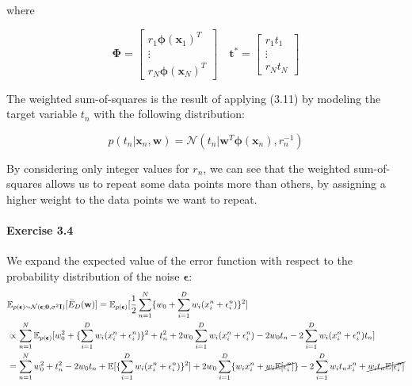 where

\begin{equation*}
\pmb{\Phi} = \begin{bmatrix}
    r_1\pmb{\phi}(\mathbf{x}_1)^T \\
    \vdots \\
    r_N\pmb{\phi}(\mathbf{x}_N)^T
\end{bmatrix} \quad
\mathbf{t}^{*} = \begin{bmatrix}
    r_1 t_1 \\
    \vdots \\
    r_N t_N
\end{bmatrix}
\end{equation*}

The weighted sum-of-squares is the result of applying (3.11) by modeling the target variable $t_n$ with the following distribution:

\begin{equation*}
    p(t_n | \mathbf{x}_n, \mathbf{w}) = \mathcal{N}(t_n | \mathbf{w}^T \pmb{\phi}(\mathbf{x}_n), r_n^{-1})
\end{equation*}

By considering only integer values for $r_n$, we can see that the weighted sum-of-squares allows us to repeat some data points more than others, by assigning a higher weight to the data points we want to repeat.

\paragraph{Exercise 3.4}

We expand the expected value of the error function with respect to the probability distribution of the noise $\pmb{\epsilon}$:
\begin{align*}
    &\mathbb{E}_{p(\pmb{\epsilon}) \sim \mathcal{N}(\pmb{\epsilon} ; \mathbf{0}, \sigma^{2} \mathbf{I})} [\bar{E}_D(\mathbf{w})] = \mathbb{E}_{p(\pmb{\epsilon})} [\frac{1}{2} \sum_{n = 1}^{N} \{w_0 + \sum_{i=1}^{D} w_i(x_i^n + \epsilon_i^n) \}^2] \\
    &\propto \sum_{n=1}^{N} \mathbb{E}_{p(\pmb\epsilon)}[w_0^2 + \{\sum_{i=1}^{D}w_i(x_i^n+\epsilon_i^n)\}^2+t_n^2+2w_0\sum_{i=1}^{D}w_i(x_i^n+\epsilon_i^n)-2w_0t_n-2\sum_{i=1}^{D}w_i(x_i^n + \epsilon_i^n)t_n] \\
    &= \sum_{n=1}^{N} w_0^2 + t_n^2 - 2w_0t_n + \mathbb{E}[\{\sum_{i=1}^{D}w_i(x_i^n+\epsilon_i^n)\}^2] + 2w_0\sum_{i=1}^{D}\{w_ix_i^n + \cancel{w_i\mathbb{E}[\epsilon_i^n]} \} - 2\sum_{i=1}^{D}w_it_nx_i^n + \cancel{w_it_n\mathbb{E}[\epsilon_i^n]}
\end{align*}

